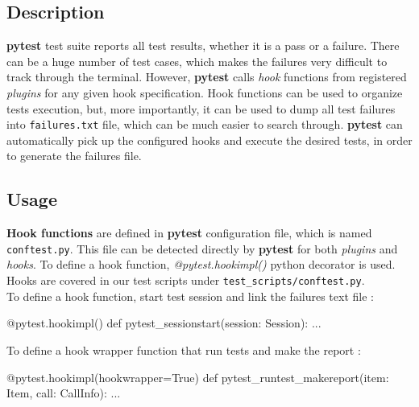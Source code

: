 \subsection{Description}
\textbf{pytest} test suite reports all test results, whether it is a pass or a failure. There can be a huge number of test cases, which makes the failures very difficult to track through the terminal. However, \textbf{pytest} calls \emph{hook} functions from registered \emph{plugins} for any given hook specification. Hook functions can be used to organize tests execution, but, more importantly, it can be used to dump all test failures into \texttt{failures.txt} file, which can be much easier to search through. \textbf{pytest} can automatically pick up the configured hooks and execute the desired tests, in order to generate the failures file.

\subsection{Usage}
\textbf{Hook functions} are defined in \textbf{pytest} configuration file, which is named \texttt{conftest.py}. This file can be detected directly by \textbf{pytest} for both \emph{plugins} and \emph{hooks}. To define a hook function, \emph{@pytest.hookimpl()} python decorator is used. Hooks are covered in our test scripts under \texttt{test\_scripts/conftest.py}. \\

To define a hook function, start test session and link the failures text file :
\begin{python}
@pytest.hookimpl()
def pytest_sessionstart(session: Session):
    ...
\end{python}

To define a hook wrapper function that run tests and make the report :
\begin{python}
@pytest.hookimpl(hookwrapper=True)
def pytest_runtest_makereport(item: Item, call: CallInfo):
    ...
\end{python}

